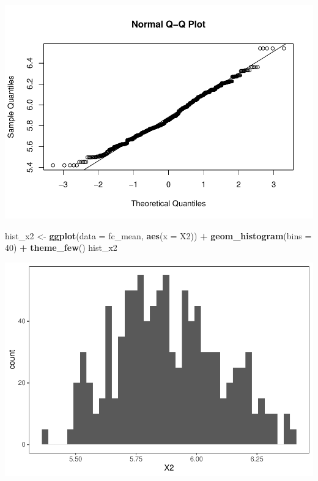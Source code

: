 \documentclass[11pt, a4paper]{report}
\newenvironment{Shaded}{\begin{snugshade}}{\end{snugshade}}
\newcommand{\DataTypeTok}[1]{\textcolor[rgb]{0.13,0.29,0.53}{#1}}
\newcommand{\DecValTok}[1]{\textcolor[rgb]{0.00,0.00,0.81}{#1}}
\newcommand{\KeywordTok}[1]{\textcolor[rgb]{0.13,0.29,0.53}{\textbf{#1}}}
\newcommand{\NormalTok}[1]{#1}
\newcommand{\OperatorTok}[1]{\textcolor[rgb]{0.81,0.36,0.00}{\textbf{#1}}}
\newcommand{\StringTok}[1]{\textcolor[rgb]{0.31,0.60,0.02}{#1}}
\theoremstyle{plain}
\theoremstyle{plain}
\theoremstyle{remark}
\begin{document}
\begin{center}\includegraphics{Econo2_P4_files/figure-latex/mean ic-2} \end{center}

\begin{Shaded}
	\begin{Highlighting}[]
		\NormalTok{hist_x2 <-}\StringTok{ }\KeywordTok{ggplot}\NormalTok{(}\DataTypeTok{data =}\NormalTok{ fc_mean, }\KeywordTok{aes}\NormalTok{(}\DataTypeTok{x =}\NormalTok{ X2)) }\OperatorTok{+}\StringTok{ }\KeywordTok{geom_histogram}\NormalTok{(}\DataTypeTok{bins =} \DecValTok{40}\NormalTok{) }\OperatorTok{+}\StringTok{ }
		\StringTok{    }\KeywordTok{theme_few}\NormalTok{()}
		\NormalTok{hist_x2}
	\end{Highlighting}
\end{Shaded}

\begin{center}\includegraphics{Econo2_P4_files/figure-latex/mean ic-3} \end{center}
\end{document}
